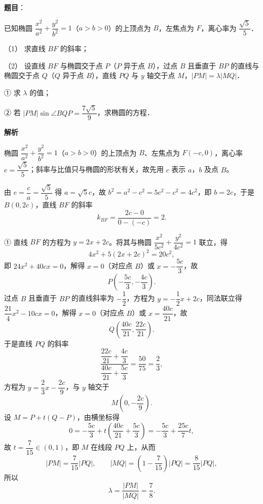 \begin{answer}

\textbf{题目}：

已知椭圆 \(\dfrac{x^2}{a^2}+\dfrac{y^2}{b^2}=1\)（\(a>b>0\)）的上顶点为 \(B\)，左焦点为 \(F\)，离心率为 \(\dfrac{\sqrt{5}}{5}\)．

（1） 求直线 \(BF\) 的斜率；

（2） 设直线 \(BF\) 与椭圆交于点 \(P\)（\(P\) 异于点 \(B\)），过点 \(B\) 且垂直于 \(BP\) 的直线与椭圆交于点 \(Q\)（\(Q\) 异于点 \(B\)），直线 \(PQ\) 与 \(y\) 轴交于点 \(M\)，\(|PM|=\lambda|MQ|\)．

① 求 \(\lambda\) 的值；

② 若 \(|PM|\sin\angle BQP=\dfrac{7\sqrt{5}}{9}\)，求椭圆的方程．

\textbf{解析}

椭圆 \(\dfrac{x^{2}}{a^{2}}+\dfrac{y^{2}}{b^{2}}=1\)（\(a>b>0\)）的上顶点为 \(B\)、左焦点为 \(F(-c,0)\)，离心率 \(e=\dfrac{\sqrt{5}}{5}\)；斜率与比值只与椭圆的形状有关，故先用 \(c\) 表示 \(a\)，\(b\) 及点 \(B\)。

由 \(e=\dfrac{c}{a}=\dfrac{\sqrt{5}}{5}\) 得 \(a=\sqrt{5}c\)，故 \(b^{2}=a^{2}-c^{2}=5c^{2}-c^{2}=4c^{2}\)，即 \(b=2c\)，于是 \(B(0,2c)\)，直线 \(BF\) 的斜率
\nopagebreak[4]
\[
k_{BF}=\dfrac{2c-0}{0-(-c)}=2.
\]

① 直线 \(BF\) 的方程为 \(y=2x+2c\)。将其与椭圆 \(\dfrac{x^{2}}{5c^{2}}+\dfrac{y^{2}}{4c^{2}}=1\) 联立，得
\nopagebreak[4]
\[
4x^{2}+5(2x+2c)^{2}=20c^{2},
\]
即 \(24x^{2}+40cx=0\)，解得 \(x=0\)（对应点 \(B\)）或 \(x=-\dfrac{5c}{3}\)，故
\nopagebreak[4]
\[
P\left(-\dfrac{5c}{3},-\dfrac{4c}{3}\right).
\]
过点 \(B\) 且垂直于 \(BP\) 的直线斜率为 \(-\dfrac{1}{2}\)，方程为 \(y=-\dfrac{1}{2}x+2c\)，同法联立得 \(\dfrac{21}{4}x^{2}-10cx=0\)，解得 \(x=0\)（对应点 \(B\)）或 \(x=\dfrac{40c}{21}\)，故
\nopagebreak[4]
\[
Q\left(\dfrac{40c}{21},\dfrac{22c}{21}\right).
\]
于是直线 \(PQ\) 的斜率
\nopagebreak[4]
\[
\dfrac{\dfrac{22c}{21}+\dfrac{4c}{3}}{\dfrac{40c}{21}+\dfrac{5c}{3}}=\dfrac{50}{75}=\dfrac{2}{3},
\]
方程为 \(y=\dfrac{2}{3}x-\dfrac{2c}{9}\)，与 \(y\) 轴交于
\nopagebreak[4]
\[
M\left(0,-\dfrac{2c}{9}\right).
\]
设 \(M=P+t(Q-P)\)，由横坐标得
\nopagebreak[4]
\[
0=-\dfrac{5c}{3}+t\left(\dfrac{40c}{21}+\dfrac{5c}{3}\right)=-\dfrac{5c}{3}+\dfrac{25c}{7}t,
\]
故 \(t=\dfrac{7}{15}\in(0,1)\)，即 \(M\) 在线段 \(PQ\) 上，从而
\nopagebreak[4]
\[
|PM|=\dfrac{7}{15}|PQ|,\qquad |MQ|=\left(1-\dfrac{7}{15}\right)|PQ|=\dfrac{8}{15}|PQ|,
\]
所以
\nopagebreak[4]
\[
\lambda=\dfrac{|PM|}{|MQ|}=\dfrac{7}{8}.
\]


\end{answer}
